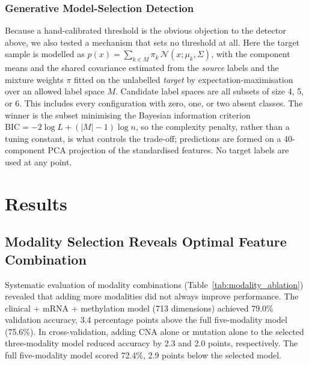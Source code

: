 \documentclass[11pt,a4paper]{article}
\begin{document}
\subsubsection{Generative Model-Selection Detection}
\label{sec:methods_lrt}

Because a hand-calibrated threshold is the obvious objection to the detector above, we also tested a
mechanism that sets no threshold at all. Here the target sample is modelled as
$p(x) = \sum_{k \in M} \pi_k \, \mathcal{N}(x ; \mu_k, \Sigma)$, with the component means and the
shared covariance estimated from the \emph{source} labels and the mixture weights $\pi$ fitted on
the unlabelled \emph{target} by expectation-maximisation over an allowed label space $M$. Candidate
label spaces are all subsets of size 4, 5, or 6. This includes every configuration with zero, one, or two
absent classes. The winner is the subset minimising the Bayesian information criterion
$\mathrm{BIC} = -2\log L + (|M| - 1)\log n$, so the complexity penalty, rather than a tuning
constant, is what controls the trade-off; predictions are formed on a 40-component PCA projection
of the standardised features. No target labels are used at any point.

\section{Results}
\label{sec:results}

\subsection{Modality Selection Reveals Optimal Feature Combination}
\label{sec:modality}

Systematic evaluation of modality combinations (Table~\ref{tab:modality_ablation}) revealed that adding more modalities did not always improve performance. The clinical + mRNA + methylation model (713 dimensions) achieved 79.0\% validation accuracy, 3.4 percentage points above the full five-modality model (75.6\%). In cross-validation, adding CNA alone or mutation alone to the selected three-modality model reduced accuracy by 2.3 and 2.0 points, respectively. The full five-modality model scored 72.4\%, 2.9 points below the selected model.
\end{document}
